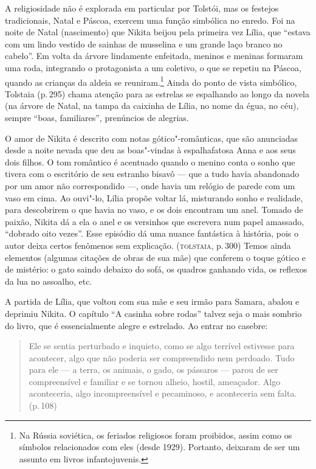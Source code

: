 A religiosidade não é explorada em particular por Tolstói, mas os
festejos tradicionais, Natal e Páscoa, exercem uma função simbólica no
enredo. Foi na noite de Natal (nascimento) que Nikita beijou pela
primeira vez Lília, que ``estava com um lindo vestido de sainhas de
musselina e um grande laço branco no cabelo''. Em volta da árvore
lindamente enfeitada, meninos e meninas formaram uma roda, integrando o
protagonista a um coletivo, o que se repetiu na Páscoa, quando as
crianças da aldeia se reuniram.\footnote{Na Rússia soviética, os
  feriados religiosos foram proibidos, assim como os símbolos
  relacionados com eles (desde 1929). Portanto, deixaram de ser um
  assunto em livros infantojuvenis.} Ainda do ponto de vista simbólico,
Tolstaia (p.\,295) chama atenção para as estrelas se espalhando ao longo
da novela (na árvore de Natal, na tampa da caixinha de Lília, no nome da
égua, no céu), sempre ``boas, familiares'', prenúncios de alegrias.

O amor de Nikita é descrito com notas gótico"-românticas, que são
anunciadas desde a noite nevada que deu as boas"-vindas à espalhafatosa
Anna e aos seus dois filhos. O tom romântico é acentuado quando o menino
conta o sonho que tivera com o escritório de seu estranho bisavô --- que
a tudo havia abandonado por um amor não correspondido ---, onde havia um
relógio de parede com um vaso em cima. Ao ouvi"-lo, Lília propõe voltar
lá, misturando sonho e realidade, para descobrirem o que havia no vaso,
e os dois encontram um anel. Tomado de paixão, Nikita dá a ela o anel e
os versinhos que escrevera num papel amassado, ``dobrado oito vezes''.
Esse episódio dá uma nuance fantástica à história, pois o autor deixa
certos fenômenos sem explicação. (\textsc{tolstaia}, p.\,300) Temos ainda
elementos (algumas citações de obras de sua mãe) que conferem o toque
gótico e de mistério: o gato saindo debaixo do sofá, os quadros ganhando
vida, os reflexos da lua no assoalho, etc.

A partida de Lília, que voltou com sua mãe e seu irmão para Samara,
abalou e deprimiu Nikita. O capítulo ``A casinha sobre rodas'' talvez
seja o mais sombrio do livro, que é essencialmente alegre e estrelado.
Ao entrar no casebre:

\begin{quote}
Ele se sentia perturbado e inquieto, como se algo terrível estivesse
para acontecer, algo que não poderia ser compreendido nem perdoado. Tudo
para ele --- a terra, os animais, o gado, os pássaros --- parou de ser
compreensível e familiar e se tornou alheio, hostil, ameaçador. Algo
aconteceria, algo incompreensível e pecaminoso, e aconteceria sem falta.
(p.\,108)
\end{quote}

